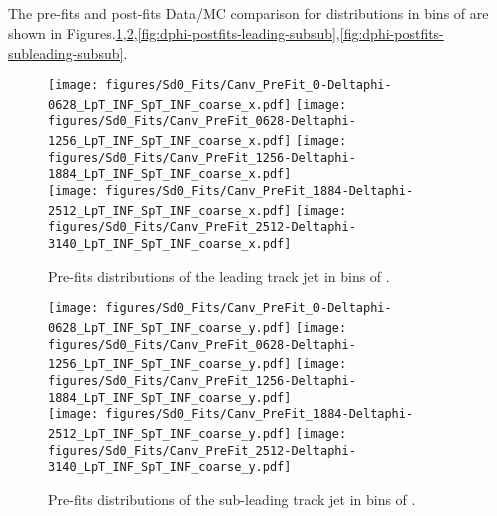 \clearpage
\subsection{\dphi}

The pre-fits and post-fits Data/MC comparison for \sdzero distributions in bins of \dphi are shown in Figures.\ref{fig:dphi-prefits-leading-subsub},\ref{fig:dphi-prefits-subleading-subsub},\ref{fig:dphi-postfits-leading-subsub},\ref{fig:dphi-postfits-subleading-subsub}.

\begin{figure}[htbp]
  \centering
 \texttt{[image: figures/Sd0\_Fits/Canv\_PreFit\_0-Deltaphi-0628\_LpT\_INF\_SpT\_INF\_coarse\_x.pdf]}
 \texttt{[image: figures/Sd0\_Fits/Canv\_PreFit\_0628-Deltaphi-1256\_LpT\_INF\_SpT\_INF\_coarse\_x.pdf]}
 \texttt{[image: figures/Sd0\_Fits/Canv\_PreFit\_1256-Deltaphi-1884\_LpT\_INF\_SpT\_INF\_coarse\_x.pdf]}\\
 \texttt{[image: figures/Sd0\_Fits/Canv\_PreFit\_1884-Deltaphi-2512\_LpT\_INF\_SpT\_INF\_coarse\_x.pdf]}
 \texttt{[image: figures/Sd0\_Fits/Canv\_PreFit\_2512-Deltaphi-3140\_LpT\_INF\_SpT\_INF\_coarse\_x.pdf]}

\caption{Pre-fits \sdzero distributions of the leading track jet in bins of \dphi. }
  \label{fig:dphi-prefits-leading-subsub}
\end{figure}


\begin{figure}[htbp]
  \centering
 \texttt{[image: figures/Sd0\_Fits/Canv\_PreFit\_0-Deltaphi-0628\_LpT\_INF\_SpT\_INF\_coarse\_y.pdf]}
 \texttt{[image: figures/Sd0\_Fits/Canv\_PreFit\_0628-Deltaphi-1256\_LpT\_INF\_SpT\_INF\_coarse\_y.pdf]}
 \texttt{[image: figures/Sd0\_Fits/Canv\_PreFit\_1256-Deltaphi-1884\_LpT\_INF\_SpT\_INF\_coarse\_y.pdf]}\\
 \texttt{[image: figures/Sd0\_Fits/Canv\_PreFit\_1884-Deltaphi-2512\_LpT\_INF\_SpT\_INF\_coarse\_y.pdf]}
 \texttt{[image: figures/Sd0\_Fits/Canv\_PreFit\_2512-Deltaphi-3140\_LpT\_INF\_SpT\_INF\_coarse\_y.pdf]}

\caption{Pre-fits \sdzero distributions of the sub-leading track jet in bins of \dphi. }
  \label{fig:dphi-prefits-subleading-subsub}
\end{figure}

